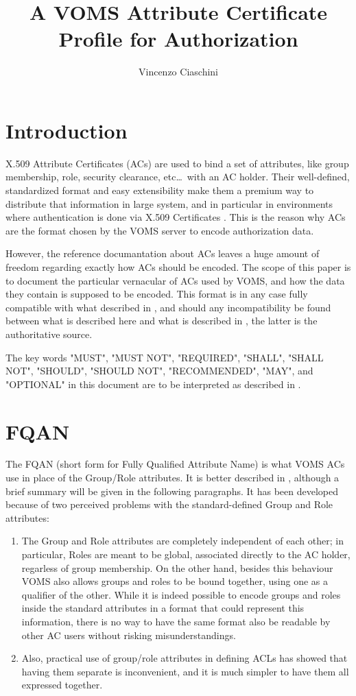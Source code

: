 \documentclass[a4]{article}
\title{A VOMS Attribute Certificate\\ Profile for Authorization}
\author{Vincenzo Ciaschini}
\begin{document}
\maketitle
\tableofcontents
\newpage
\section{Introduction}
X.509 Attribute Certificates (ACs) \cite{rfc3281} are used to bind a
set of attributes, like group membership, role, security clearance,
etc\ldots\ with an AC holder.  Their well-defined, standardized format
and easy extensibility make them a premium way to distribute that
information in large system, and in particular in environments where
authentication is done via X.509 Certificates \cite{rfc3280}.  This is
the reason why ACs are the format chosen by the VOMS server
\cite{voms} to encode authorization data.

However, the reference documantation about ACs leaves a huge amount of
freedom regarding exactly how ACs should be encoded. The scope of this
paper is to document the particular vernacular of ACs used by VOMS,
and how the data they contain is supposed to be encoded.  This format
is in any case fully compatible with what described in \cite{rfc3281},
and should any incompatibility be found between what is described here
and what is described in \cite{rfc3281}, the latter is the
authoritative source.

The key words "MUST", "MUST NOT", "REQUIRED", "SHALL", "SHALL NOT",
"SHOULD", "SHOULD NOT", "RECOMMENDED", "MAY", and "OPTIONAL" in this
document are to be interpreted as described in \cite{rfc2119}.

\section{FQAN}
The FQAN (short form for Fully Qualified Attribute Name) is what VOMS
ACs use in place of the Group/Role attributes. It is better described
in \cite{fqan}, although a brief summary will be given in the
following paragraphs.  It has been developed because of two perceived
problems with the standard-defined\cite{rfc3281} Group and Role
attributes:

\begin{enumerate}
\item The Group and Role attributes are completely independent of each
other; in particular, Roles are meant to be global, associated
directly to the AC holder, regarless of group membership. On the other
hand, besides this behaviour VOMS also allows groups and roles to be
bound together, using one as a qualifier of the other.  While it is
indeed possible to encode groups and roles inside the standard
attributes in a format that could represent this information, there is
no way to have the same format also be readable by other AC users
without risking misunderstandings.
\item Also, practical use of group/role attributes in defining ACLs
has showed that having them separate is inconvenient, and it is much
simpler to have them all expressed together.
\end{enumerate}
\end{document}
